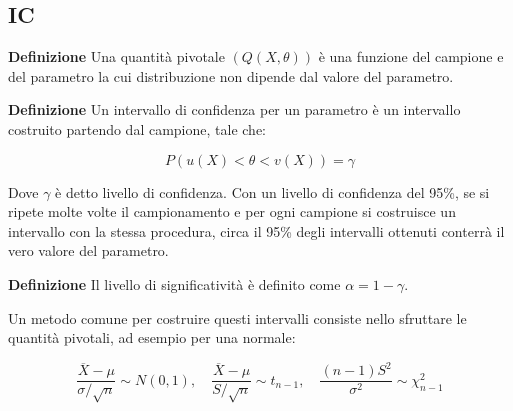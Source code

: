 \documentclass{article}
\newcommand{\df}{\noindent\textbf{Definizione} }
\begin{document}
\subsection{IC}

\df Una quantità pivotale $(Q(X,\theta))$ è una funzione del campione e del parametro la cui distribuzione non dipende dal valore del parametro.\newline

\df Un intervallo di confidenza per un parametro è un intervallo costruito partendo dal campione, tale che:

\[
P(u(X)<\theta<v(X))=\gamma
\]

\vspace{5pt}

\noindent Dove $\gamma$ è detto livello di confidenza. Con un livello di confidenza del 95\%, se si ripete molte volte il campionamento e per ogni campione si costruisce un intervallo con la stessa procedura, circa il 95\% degli intervalli ottenuti conterrà il vero valore del parametro.\newline

\df Il livello di significatività è definito come $\alpha=1 - \gamma$.\newline

Un metodo comune per costruire questi intervalli consiste nello sfruttare le quantità pivotali, ad esempio per una normale:

$$\frac{\overline{X}-\mu}{\sigma/\sqrt{n}}\sim N(0,1),\quad \frac{\overline{X}-\mu}{S/\sqrt{n}}\sim t_{n-1},\quad \frac{(n-1)S^2}{\sigma^2}\sim\chi^2_{n-1}$$
\end{document}

